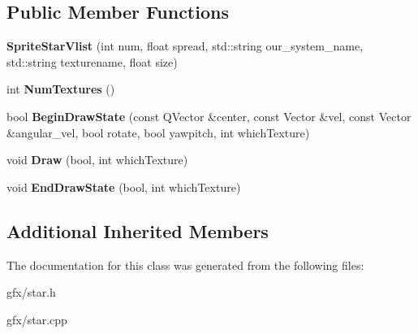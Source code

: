 \subsection*{Public Member Functions}
\begin{DoxyCompactItemize}
\item 
{\bfseries Sprite\+Star\+Vlist} (int num, float spread, std\+::string our\+\_\+system\+\_\+name, std\+::string texturename, float size)\hypertarget{classSpriteStarVlist_a8edbcb2da98577895cebb592972da973}{}\label{classSpriteStarVlist_a8edbcb2da98577895cebb592972da973}

\item 
int {\bfseries Num\+Textures} ()\hypertarget{classSpriteStarVlist_a78344b990a722422b5183ed0db74b38a}{}\label{classSpriteStarVlist_a78344b990a722422b5183ed0db74b38a}

\item 
bool {\bfseries Begin\+Draw\+State} (const Q\+Vector \&center, const Vector \&vel, const Vector \&angular\+\_\+vel, bool rotate, bool yawpitch, int which\+Texture)\hypertarget{classSpriteStarVlist_a35f68627d2bc8abc6eac145f3f5daf22}{}\label{classSpriteStarVlist_a35f68627d2bc8abc6eac145f3f5daf22}

\item 
void {\bfseries Draw} (bool, int which\+Texture)\hypertarget{classSpriteStarVlist_a257fe8802cc79876d53d241ae88a5925}{}\label{classSpriteStarVlist_a257fe8802cc79876d53d241ae88a5925}

\item 
void {\bfseries End\+Draw\+State} (bool, int which\+Texture)\hypertarget{classSpriteStarVlist_a36ba8948a5aabf7c8d6117c4749f01bc}{}\label{classSpriteStarVlist_a36ba8948a5aabf7c8d6117c4749f01bc}

\end{DoxyCompactItemize}
\subsection*{Additional Inherited Members}


The documentation for this class was generated from the following files\+:\begin{DoxyCompactItemize}
\item 
gfx/star.\+h\item 
gfx/star.\+cpp\end{DoxyCompactItemize}
